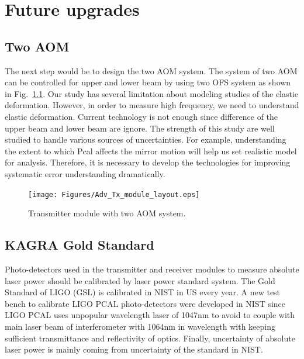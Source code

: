 
\chapter{Future upgrades} %

\label{Chapter7} %
\section{Two AOM}
The next step would be to design the two AOM system. The system of two AOM can be controlled for upper and lower beam by using two OFS system as shown in Fig.~\ref{fig:Adv_Tx_module_layout}. Our study has several limitation about modeling studies of the elastic deformation. However, in order to measure high frequency, we need to understand elastic deformation.
Current technology is not enough since difference of the upper beam and lower beam are ignore. The strength of this study are well studied to handle various sources of uncertainties. For example, understanding the extent to which Pcal affects the mirror motion will help us set realistic model for analysis. Therefore, it is necessary to develop the technologies for improving systematic error understanding dramatically.
\begin{figure}
\begin{center}
\texttt{[image: Figures/Adv\_Tx\_module\_layout.eps]}
\caption{Transmitter module with two AOM system.} 
\label{fig:Adv_Tx_module_layout} 
\end{center}
\end{figure}

\section{KAGRA Gold Standard}
Photo-detectors used in the transmitter and receiver modules to measure absolute laser power should be calibrated by laser power standard system. The Gold Standard of LIGO (GSL) is calibrated in NIST in US every year. A new test bench to calibrate LIGO PCAL photo-detectors were developed in NIST since LIGO PCAL uses unpopular wavelength laser of 1047nm to avoid to couple with main laser beam of interferometer with 1064nm in wavelength with keeping sufficient transmittance and reflectivity of optics. Finally, uncertainty of absolute laser power is mainly coming from uncertainty of the standard in NIST. 

